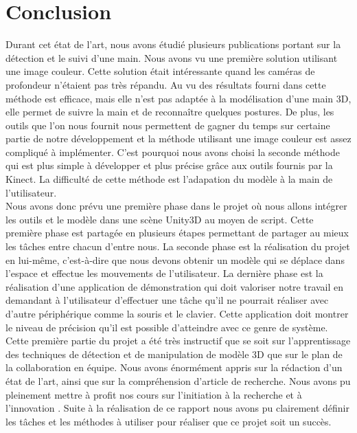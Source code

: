 \chapter*{Conclusion}
Durant cet état de l'art, nous avons étudié plusieurs publications portant sur la détection et le suivi
d'une main. Nous avons vu une première solution utilisant une image couleur. Cette solution était
intéressante quand les caméras de profondeur n'étaient pas très répandu. Au vu des résultats fourni dans
\cite{haarlike} cette méthode est efficace, mais elle n'est pas adaptée à la modélisation d'une main 3D, elle permet
de suivre la main et de reconnaître quelques postures. De plus, les outils que l'on nous fournit nous permettent
de gagner du temps sur certaine partie de notre développement et la méthode utilisant une image couleur
est assez compliqué à implémenter. C'est pourquoi nous avons choisi la seconde méthode qui est plus
simple à développer et plus précise grâce aux outils fournis par la Kinect. La difficulté de cette méthode
est l'adapation du modèle à la main de l'utilisateur.\\

Nous avons donc prévu une première phase dans le projet où nous allons intégrer les outils et le modèle
dans une scène Unity3D au moyen de script. Cette première phase est partagée en plusieurs étapes permettant
de partager au mieux les tâches entre chacun d'entre nous. La seconde phase est la réalisation du projet en lui-même, c'est-à-dire 
que nous devons obtenir un modèle qui se déplace dans l'espace et effectue les mouvements de l'utilisateur.
La dernière phase est la réalisation d'une application de démonstration qui doit valoriser notre travail
en demandant à l'utilisateur d'effectuer une tâche qu'il ne pourrait réaliser avec d'autre périphérique comme
la souris et le clavier. Cette application doit montrer le niveau de précision qu'il est possible d'atteindre
avec ce genre de système.\\

Cette première partie du projet a été très instructif que se soit sur l'apprentissage des techniques de détection et de manipulation
de modèle 3D que sur le plan de la collaboration en équipe. Nous avons énormément appris sur la rédaction d'un
état de l'art, ainsi que sur la compréhension d'article de recherche. Nous avons pu pleinement mettre à profit
nos cours sur \og l'initiation à la recherche et à l'innovation \fg. Suite à la réalisation de ce rapport nous avons pu
clairement définir les tâches et les méthodes à utiliser pour réaliser que ce projet soit un succès. 
